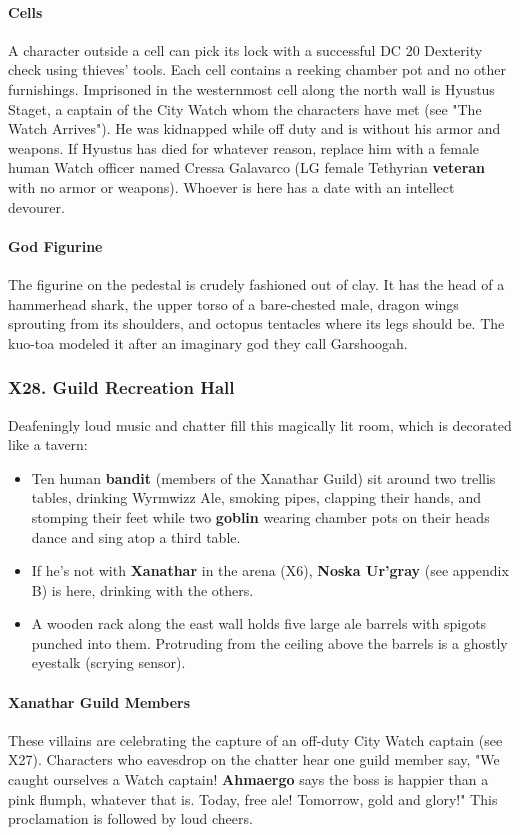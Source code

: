\documentclass[10pt,a4paper,twoside,twocolumn,openany,nodeprecatedcode]{dndbook}
\begin{document}
\paragraph{Cells}
A character outside a cell can pick its lock with a successful DC 20 Dexterity check using thieves' tools. Each cell contains a reeking chamber pot and no other furnishings.
Imprisoned in the westernmost cell along the north wall is Hyustus Staget, a captain of the City Watch whom the characters have met (see "The Watch Arrives"). He was kidnapped while off duty and is without his armor and weapons. If Hyustus has died for whatever reason, replace him with a female human Watch officer named Cressa Galavarco (LG female Tethyrian \textbf{veteran} with no armor or weapons). Whoever is here has a date with an intellect devourer.
\paragraph{God Figurine}
The figurine on the pedestal is crudely fashioned out of clay. It has the head of a hammerhead shark, the upper torso of a bare-chested male, dragon wings sprouting from its shoulders, and octopus tentacles where its legs should be. The kuo-toa modeled it after an imaginary god they call Garshoogah.
\subsubsection{X28. Guild Recreation Hall}
Deafeningly loud music and chatter fill this magically lit room, which is decorated like a tavern:
\begin{itemize}

\item Ten human \textbf{bandit} (members of the Xanathar Guild) sit around two trellis tables, drinking Wyrmwizz Ale, smoking pipes, clapping their hands, and stomping their feet while two \textbf{goblin} wearing chamber pots on their heads dance and sing atop a third table.
\item If he's not with \textbf{Xanathar} in the arena (X6), \textbf{Noska Ur'gray} (see appendix B) is here, drinking with the others.
\item A wooden rack along the east wall holds five large ale barrels with spigots punched into them. Protruding from the ceiling above the barrels is a ghostly eyestalk (scrying sensor).
\end{itemize}


\paragraph{Xanathar Guild Members}
These villains are celebrating the capture of an off-duty City Watch captain (see X27). Characters who eavesdrop on the chatter hear one guild member say, "We caught ourselves a Watch captain! \textbf{Ahmaergo} says the boss is happier than a pink flumph, whatever that is. Today, free ale! Tomorrow, gold and glory!" This proclamation is followed by loud cheers.
\end{document}
